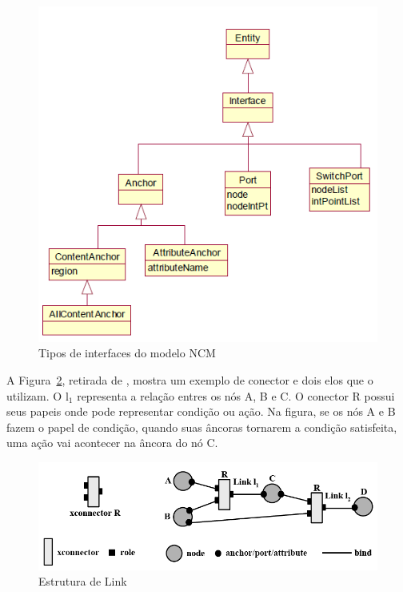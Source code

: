 \begin{figure}[!ht]
    \centering
    \includegraphics[scale=0.6,keepaspectratio=true]{figuras/NCM_interface.png}
    \caption{Tipos de interfaces do modelo NCM \cite{Soares:2005qy}}
    \label{fig:NCM_Interface}
\end{figure}

A Figura~\ref{fig:link}, retirada de \cite{muchaluat2003relations}, mostra um exemplo de conector e dois elos que o utilizam. O l$_1$ representa a relação entres os nós A, B e C. O conector R possui seus papeis onde pode representar condição ou ação. Na figura, se os nós A e B fazem o papel de condição, quando suas âncoras tornarem a condição satisfeita, uma ação vai acontecer na âncora do nó C.

\begin{figure}[!ht]
    \centering
    \includegraphics  [scale=0.6,keepaspectratio=true]{figuras/conector.png}
    \caption{Estrutura de Link \cite{muchaluat2003relations}}
    \label{fig:link}
\end{figure}



